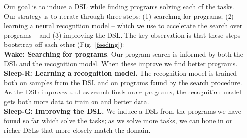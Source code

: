 \documentclass{article}
\newcommand{\system}{\textsc{DreamCoder}~}
\begin{document}
Our goal  is to induce a DSL while finding programs solving each of the tasks.
Our strategy is to iterate through three steps: (1) searching for programs; (2) learning a neural recognition model -- which we use
to accelerate the search over programs -- and (3) improving the DSL.
The key observation is that these steps bootstrap off each other (Fig.~\ref{feeding}):
\\\noindent \textbf{Wake: Searching for programs.}  Our program search  is informed by both the DSL and the recognition model.
When these improve we find better programs.
\\\noindent\textbf{Sleep-R: Learning a recognition model.} The recognition model is trained both on samples from the DSL and on programs found by the search procedure. As the DSL improves and as search finds more programs, the recognition model gets both more data to train on and better data.
\\\noindent\textbf{Sleep-G: Improving the DSL.} We induce a DSL from the programs we have found so far which solve the tasks;
  as we solve more tasks, we can hone in on richer DSLs that more closely match the domain.

\end{document}
